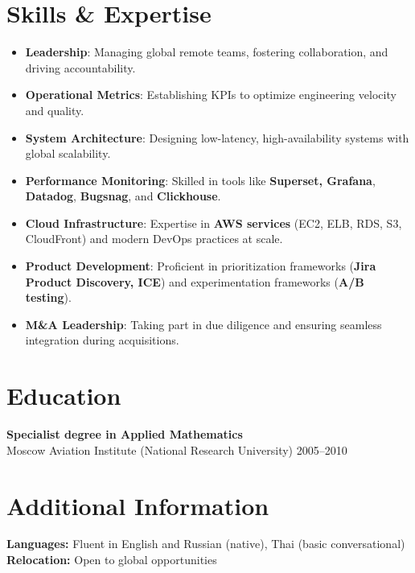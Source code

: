\documentclass[11pt,a4paper]{article}
\begin{document}
\section*{Skills \& Expertise}
\begin{itemize}
    \item \textbf{Leadership}: Managing global remote teams, fostering collaboration, and driving accountability.
    \item \textbf{Operational Metrics}: Establishing KPIs to optimize engineering velocity and quality.
    \item \textbf{System Architecture}: Designing low-latency, high-availability systems with global scalability.
    \item \textbf{Performance Monitoring}: Skilled in tools like \textbf{Superset, Grafana}, \textbf{Datadog}, \textbf{Bugsnag}, and \textbf{Clickhouse}.
    \item \textbf{Cloud Infrastructure}: Expertise in \textbf{AWS services} (EC2, ELB, RDS, S3, CloudFront) and modern DevOps practices at scale.
    \item \textbf{Product Development}: Proficient in prioritization frameworks (\textbf{Jira Product Discovery, ICE}) and experimentation frameworks (\textbf{A/B testing}).
    \item \textbf{M\&A Leadership}: Taking part in due diligence and ensuring seamless integration during acquisitions.
\end{itemize}

\section*{Education}
\textbf{Specialist degree in Applied Mathematics} \\
Moscow Aviation Institute (National Research University) \hfill 2005--2010



\section*{Additional Information}
\textbf{Languages:} Fluent in English and Russian (native), Thai (basic conversational) \\
\textbf{Relocation:} Open to global opportunities
\end{document}
